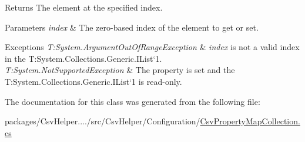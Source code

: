 \begin{DoxyReturn}{Returns}
The element at the specified index. 
\end{DoxyReturn}

\begin{DoxyParams}{Parameters}
{\em index} & The zero-\/based index of the element to get or set. \\
\hline
\end{DoxyParams}

\begin{DoxyExceptions}{Exceptions}
{\em T\-:\-System.\-Argument\-Out\-Of\-Range\-Exception} & {\itshape index}  is not a valid index in the T\-:\-System.\-Collections.\-Generic.\-I\-List`1. \\
\hline
{\em T\-:\-System.\-Not\-Supported\-Exception} & The property is set and the T\-:\-System.\-Collections.\-Generic.\-I\-List`1 is read-\/only. \\
\hline
\end{DoxyExceptions}


The documentation for this class was generated from the following file\-:\begin{DoxyCompactItemize}
\item 
packages/\-Csv\-Helper..../src/\-Csv\-Helper/\-Configuration/\hyperlink{a00184}{Csv\-Property\-Map\-Collection.\-cs}\end{DoxyCompactItemize}

